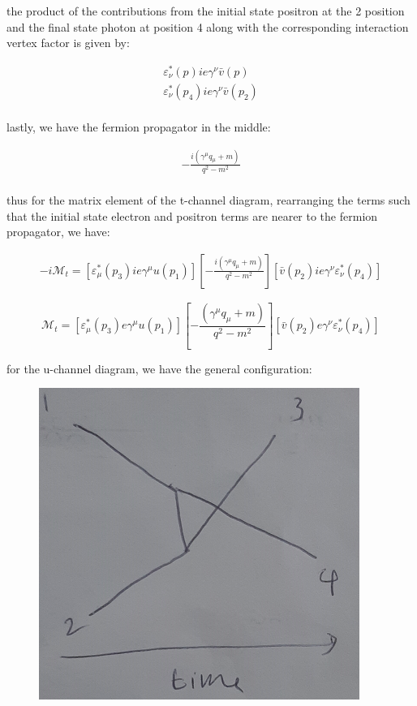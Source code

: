 \documentclass[11pt]{article}
\theoremstyle{definition}
\begin{document}
the product of the contributions from the initial state positron at the 2 position and the final state photon at position 4 along with the corresponding interaction vertex factor is given by:

\begin{align}
    \varepsilon^{*}_{\nu}(p)ie\gamma^{\nu}\bar{v}(p)\\
    \varepsilon^{*}_{\nu}(p_4)ie\gamma^{\nu}\bar{v}(p_2)\\
\end{align}

lastly, we have the fermion propagator in the middle:

\begin{align}
    -\frac{i(\gamma^{\mu} q_{\mu} + m)}{q^2-m^2}\\
\end{align}

thus for the matrix element of the t-channel diagram, rearranging the terms such that the initial state electron and positron terms are nearer to the fermion propagator, we have:

\begin{align}
    -i\mathcal{M}_t = 
    \left[
        \varepsilon^{*}_{\mu}(p_3)ie\gamma^{\mu}u(p_1)
    \right]
    \left[
        -\frac{i(\gamma^{\mu} q_{\mu} + m)}{q^2-m^2}
    \right]
    \left[
        \bar{v}(p_2)ie\gamma^{\nu}\varepsilon^{*}_{\nu}(p_4)
    \right]
\end{align}

\begin{equation}
\boxed{
    \mathcal{M}_t = 
    \left[
        \varepsilon^{*}_{\mu}(p_3)e\gamma^{\mu}u(p_1)
    \right]
    \left[
        -\frac{(\gamma^{\mu} q_{\mu} + m)}{q^2-m^2}
    \right]
    \left[
        \bar{v}(p_2)e\gamma^{\nu}\varepsilon^{*}_{\nu}(p_4)
    \right]
}
\end{equation}

for the u-channel diagram, we have the general configuration:

\begin{figure}[H]
    \centering
    \includegraphics[scale = 0.4]{general u-channel.png}
\end{figure}
\end{document}
